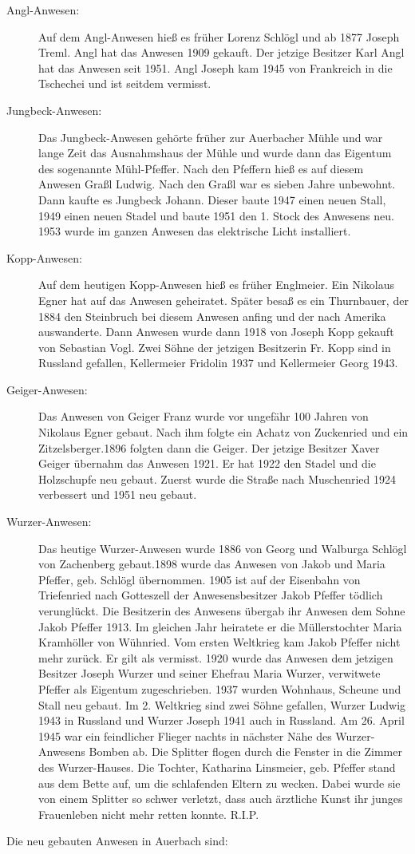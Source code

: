 \documentclass[12pt,a4pager]{book}
\begin{document}
\begin{description}
\item[Angl-Anwesen:] Auf dem Angl-Anwesen hieß es früher Lorenz Schlögl und ab
1877 Joseph Treml. Angl hat das Anwesen 1909 gekauft. Der jetzige Besitzer Karl
Angl hat das Anwesen seit 1951. Angl Joseph kam 1945 von Frankreich in die
Tschechei und ist seitdem vermisst.

\item[Jungbeck-Anwesen:] Das Jungbeck-Anwesen gehörte früher zur Auerbacher
Mühle und war lange Zeit das Ausnahmshaus der Mühle und wurde dann das Eigentum
des sogenannte Mühl-Pfeffer. Nach den Pfeffern hieß es auf diesem Anwesen Graßl
Ludwig. Nach den Graßl war es sieben Jahre unbewohnt. Dann kaufte es Jungbeck
Johann. Dieser baute 1947 einen neuen Stall, 1949 einen neuen Stadel und baute
1951 den 1. Stock des Anwesens neu. 1953 wurde im ganzen Anwesen das elektrische
Licht installiert.

\item[Kopp-Anwesen:] Auf dem heutigen Kopp-Anwesen hieß es früher Englmeier. Ein
Nikolaus Egner hat auf das Anwesen geheiratet. Später besaß es ein Thurnbauer,
der 1884 den Steinbruch bei diesem Anwesen anfing und der nach Amerika
auswanderte. Dann Anwesen wurde dann 1918 von Joseph Kopp gekauft von Sebastian
Vogl. Zwei Söhne der jetzigen Besitzerin Fr. Kopp sind in Russland gefallen,
Kellermeier Fridolin 1937 und Kellermeier Georg 1943.

\item[Geiger-Anwesen:] Das Anwesen von Geiger Franz wurde vor ungefähr 100
Jahren von Nikolaus Egner gebaut. Nach ihm folgte ein Achatz von Zuckenried und
ein Zitzelsberger.1896 folgten dann die Geiger. Der jetzige Besitzer Xaver
Geiger übernahm das Anwesen 1921. Er hat 1922 den Stadel und die Holzschupfe neu
gebaut. Zuerst wurde die Straße nach Muschenried 1924 verbessert und 1951 neu
gebaut.

\item[Wurzer-Anwesen:] Das heutige Wurzer-Anwesen wurde 1886 von Georg und
Walburga Schlögl von Zachenberg gebaut.1898 wurde das Anwesen von Jakob und
Maria Pfeffer, geb. Schlögl übernommen. 1905 ist auf der Eisenbahn von
Triefenried nach Gotteszell der Anwesensbesitzer Jakob Pfeffer tödlich
verunglückt. Die Besitzerin des Anwesens übergab ihr Anwesen dem Sohne Jakob
Pfeffer 1913. Im gleichen Jahr heiratete er die Müllerstochter Maria Kramhöller
von Wühnried. Vom ersten Weltkrieg kam Jakob Pfeffer nicht mehr zurück. Er gilt
als vermisst. 1920 wurde das Anwesen dem jetzigen Besitzer Joseph Wurzer und
seiner Ehefrau Maria Wurzer, verwitwete Pfeffer als Eigentum zugeschrieben. 1937
wurden Wohnhaus, Scheune und Stall neu gebaut. Im 2. Weltkrieg sind zwei Söhne
gefallen, Wurzer Ludwig 1943 in Russland und Wurzer Joseph 1941 auch in
Russland. Am 26. April 1945 war ein feindlicher Flieger nachts in nächster Nähe
des Wurzer-Anwesens Bomben ab. Die Splitter flogen durch die Fenster in die
Zimmer des Wurzer-Hauses. Die Tochter, Katharina Linsmeier, geb. Pfeffer stand
aus dem Bette auf‚ um die schlafenden Eltern zu wecken. Dabei wurde sie von
einem Splitter so schwer verletzt, dass auch ärztliche Kunst ihr junges
Frauenleben nicht mehr retten konnte. R.I.P.
\end{description}
Die neu gebauten Anwesen in Auerbach sind:
\end{document}
